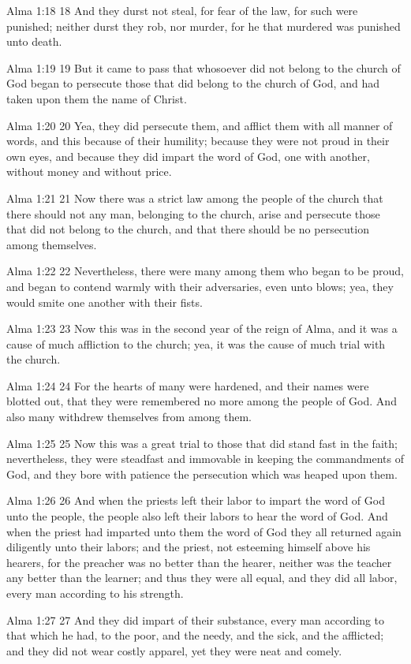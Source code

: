 Alma 1:18
 18 And they durst not steal, for fear of the law, for such were
punished; neither durst they rob, nor murder, for he that
murdered was punished unto death.

Alma 1:19
 19 But it came to pass that whosoever did not belong to the
church of God began to persecute those that did belong to the
church of God, and had taken upon them the name of Christ.

Alma 1:20
 20 Yea, they did persecute them, and afflict them with all
manner of words, and this because of their humility; because they
were not proud in their own eyes, and because they did impart the
word of God, one with another, without money and without price.

Alma 1:21
 21 Now there was a strict law among the people of the church
that there should not any man, belonging to the church, arise and
persecute those that did not belong to the church, and that there
should be no persecution among themselves.

Alma 1:22
 22 Nevertheless, there were many among them who began to be
proud, and began to contend warmly with their adversaries, even
unto blows; yea, they would smite one another with their fists.

Alma 1:23
 23 Now this was in the second year of the reign of Alma, and it
was a cause of much affliction to the church; yea, it was the
cause of much trial with the church.

Alma 1:24
 24 For the hearts of many were hardened, and their names were
blotted out, that they were remembered no more among the people
of God. And also many withdrew themselves from among them.

Alma 1:25
 25 Now this was a great trial to those that did stand fast in
the faith; nevertheless, they were steadfast and immovable in
keeping the commandments of God, and they bore with patience the
persecution which was heaped upon them.

Alma 1:26
 26 And when the priests left their labor to impart the word of
God unto the people, the people also left their labors to hear
the word of God. And when the priest had imparted unto them the
word of God they all returned again diligently unto their labors;
and the priest, not esteeming himself above his hearers, for the
preacher was no better than the hearer, neither was the teacher
any better than the learner; and thus they were all equal, and
they did all labor, every man according to his strength.

Alma 1:27
 27 And they did impart of their substance, every man according
to that which he had, to the poor, and the needy, and the sick,
and the afflicted; and they did not wear costly apparel, yet they
were neat and comely.

